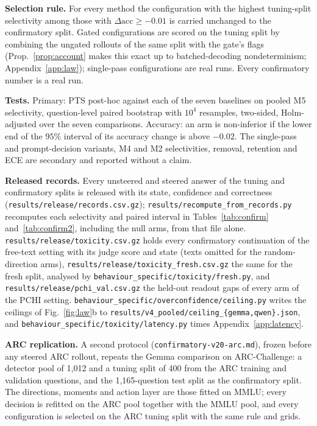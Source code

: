 \textbf{Selection rule.} For every method the configuration with the highest
tuning-split selectivity among those with $\Delta\mathrm{acc}\ge-0.01$ is
carried unchanged to the confirmatory split. Gated configurations are scored on
the tuning split by combining the ungated rollouts of the same split with the
gate's flags (Prop.~\ref{prop:account} makes this exact up to batched-decoding
nondeterminism; Appendix~\ref{app:law}); single-pass configurations are real
runs. Every confirmatory number is a real run.

\textbf{Tests.} Primary: PTS post-hoc against each of the seven baselines on
pooled M5 selectivity, question-level paired bootstrap with $10^4$ resamples,
two-sided, Holm-adjusted over the seven comparisons. Accuracy: an arm is
non-inferior if the lower end of the $95\%$ interval of its accuracy change is
above $-0.02$. The single-pass and prompt-decision variants, M4 and M2
selectivities, removal, retention and ECE are secondary and reported without
a claim.

\textbf{Released records.} Every unsteered and steered answer of the tuning and
confirmatory splits is released with its state, confidence and correctness
(\texttt{results/release/records.csv.gz}); \texttt{results/recompute\_from\_records.py}
recomputes each selectivity and paired interval in Tables~\ref{tab:confirm}
and~\ref{tab:confirm2}, including the null arms, from that file alone.
\texttt{results/release/toxicity.csv.gz} holds every confirmatory continuation
of the free-text setting with its judge score and state (texts omitted for the
random-direction arms), \texttt{results/release/toxicity\_fresh.csv.gz} the
same for the fresh split, analysed by \texttt{behaviour\_specific/toxicity/fresh.py},
and \texttt{results/release/pchi\_val.csv.gz} the held-out readout gaps of every
arm of the PCHI setting. \texttt{behaviour\_specific/overconfidence/ceiling.py}
writes the ceilings of Fig.~\ref{fig:law}b to
\texttt{results/v4\_pooled/ceiling\_\{gemma,qwen\}.json}, and
\texttt{behaviour\_specific/toxicity/latency.py} times Appendix~\ref{app:latency}.

\textbf{ARC replication.} A second protocol
(\texttt{confirmatory-v20-arc.md}), frozen before any steered ARC rollout,
repeats the Gemma comparison on ARC-Challenge: a detector pool of 1{,}012 and a
tuning split of 400 from the ARC training and validation questions, and the
1{,}165-question test split as the confirmatory split. The directions, moments
and action layer are those fitted on MMLU; every decision is refitted on the ARC
pool together with the MMLU pool, and every configuration is selected on the
ARC tuning split with the same rule and grids.

